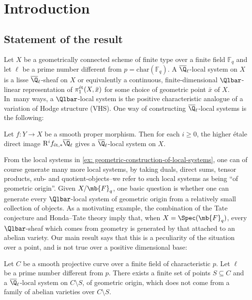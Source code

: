 \section{Introduction}

\subsection{Statement of the result}
Let $X$ be a geometrically connected scheme of finite type over a finite field $\mathbb{F}_q$ and let $\ell$ be a prime number different from $p=\mathrm{char}(\mathbb{F}_q)$. A $\overline{\Q}_\ell$-local system on $X$ is a lisse $\overline{\Q}_\ell$-sheaf on $X$ or equivalently a continuous, finite-dimensional $\Qlbar$-linear representation of $\pi^\textnormal{ét}_1(X,\bar x)$ for some choice of geometric point $\bar x$ of $X$. In~many ways, a $\Qlbar$-local system is the positive characteristic analogue of a variation of Hodge structure (VHS). One way of constructing $\overline{\Q}_\ell$-local systems is the following:

\begin{example}\label{ex: geometric-construction-of-local-systems}
Let $f\colon Y\to X$ be a smooth proper morphism. Then for each $i\geq 0$, the higher étale direct image $\mathrm{R}^if_{\textnormal{ét},\ast}\overline{\Q}_\ell$ gives a $\overline{\Q}_\ell$-local system on $X$.
\end{example}

From the local systems in \cref{ex: geometric-construction-of-local-systems}, one can of course generate many more local systems, by taking duals, direct sums, tensor products, sub- and quotient-objects--we refer to such local systems as being \enquote{of geometric origin}. Given $X/\mb{F}_q$, one basic question is whether one can generate every $\Qlbar$-local system of geometric origin from a relatively small collection of objects. As a motivating example, the combination of the Tate conjecture and Honda--Tate theory imply that, when $X=\Spec (\mb{F}_q)$, every $\Qlbar$-sheaf which comes from geometry is generated by that attached to an abelian variety. Our main result says that this is a peculiarity of the situation over a point, and is not true over a positive dimensional base:

\begin{thm}\label{thm: main-result}
Let $C$ be a smooth projective curve over a finite field of characteristic $p$. Let $\ell$ be a prime number different from $p$. There exists a finite set of points $S\subseteq C$ and a $\overline{\Q}_\ell$-local system on $C\setminus S$, of geometric origin, which does not come from a family of abelian varieties over $C\setminus S$.
\end{thm}


